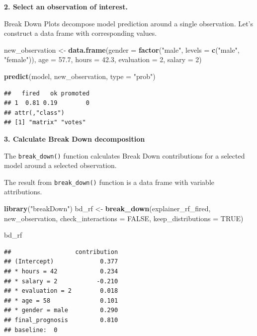 \documentclass[]{book}
\newenvironment{Shaded}{\begin{snugshade}}{\end{snugshade}}
\newcommand{\DataTypeTok}[1]{\textcolor[rgb]{0.13,0.29,0.53}{#1}}
\newcommand{\DecValTok}[1]{\textcolor[rgb]{0.00,0.00,0.81}{#1}}
\newcommand{\FloatTok}[1]{\textcolor[rgb]{0.00,0.00,0.81}{#1}}
\newcommand{\KeywordTok}[1]{\textcolor[rgb]{0.13,0.29,0.53}{\textbf{#1}}}
\newcommand{\NormalTok}[1]{#1}
\newcommand{\OtherTok}[1]{\textcolor[rgb]{0.56,0.35,0.01}{#1}}
\newcommand{\StringTok}[1]{\textcolor[rgb]{0.31,0.60,0.02}{#1}}
\theoremstyle{definition}
\theoremstyle{definition}
\theoremstyle{definition}
\theoremstyle{remark}
\begin{document}
\textbf{2. Select an observation of interest.}

Break Down Plots decompose model prediction around a single observation.
Let's construct a data frame with corresponding values.

\begin{Shaded}
\begin{Highlighting}[]
\NormalTok{new_observation <-}\StringTok{ }\KeywordTok{data.frame}\NormalTok{(}\DataTypeTok{gender =} \KeywordTok{factor}\NormalTok{(}\StringTok{"male"}\NormalTok{, }\DataTypeTok{levels =} \KeywordTok{c}\NormalTok{(}\StringTok{"male"}\NormalTok{, }\StringTok{"female"}\NormalTok{)),}
                      \DataTypeTok{age =} \FloatTok{57.7}\NormalTok{,}
                      \DataTypeTok{hours =} \FloatTok{42.3}\NormalTok{,}
                      \DataTypeTok{evaluation =} \DecValTok{2}\NormalTok{,}
                      \DataTypeTok{salary =} \DecValTok{2}\NormalTok{)}

\KeywordTok{predict}\NormalTok{(model, new_observation, }\DataTypeTok{type =} \StringTok{"prob"}\NormalTok{)}
\end{Highlighting}
\end{Shaded}

\begin{verbatim}
##   fired   ok promoted
## 1  0.81 0.19        0
## attr(,"class")
## [1] "matrix" "votes"
\end{verbatim}

\textbf{3. Calculate Break Down decomposition}

The \texttt{break\_down()} function calculates Break Down contributions
for a selected model around a selected observation.

The result from \texttt{break\_down()} function is a data frame with
variable attributions.

\begin{Shaded}
\begin{Highlighting}[]
\KeywordTok{library}\NormalTok{(}\StringTok{"breakDown"}\NormalTok{)}
\NormalTok{bd_rf <-}\StringTok{ }\KeywordTok{break_down}\NormalTok{(explainer_rf_fired,}
\NormalTok{                 new_observation,}
                 \DataTypeTok{check_interactions =} \OtherTok{FALSE}\NormalTok{,}
                 \DataTypeTok{keep_distributions =} \OtherTok{TRUE}\NormalTok{)}

\NormalTok{bd_rf}
\end{Highlighting}
\end{Shaded}

\begin{verbatim}
##                  contribution
## (Intercept)             0.377
## * hours = 42            0.234
## * salary = 2           -0.210
## * evaluation = 2        0.018
## * age = 58              0.101
## * gender = male         0.290
## final_prognosis         0.810
## baseline:  0
\end{verbatim}
\end{document}
